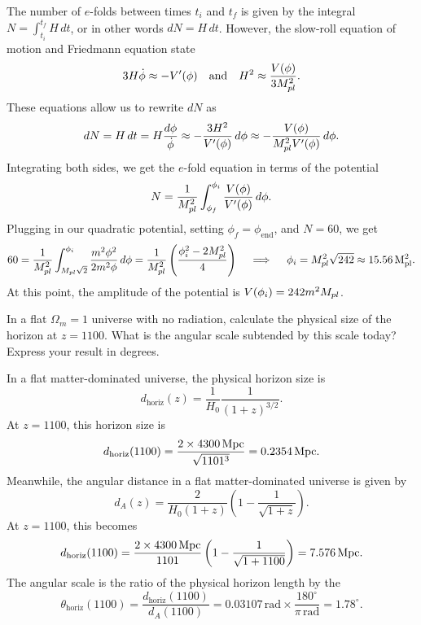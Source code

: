 \documentclass{lkx_pset}
\begin{document}
\begin{parts}
  The number of $e$-folds between times $t_i$ and $t_f$ is given by the integral $N=\int_{t_i}^{t_f} H\,dt$, or in other words $dN=H\,dt$. However, the slow-roll equation of motion and Friedmann equation state
  \[
    3H\dot{\phi}\approx -V'(\phi) \quad\textrm{and}\quad
    H^2 \approx \frac{V(\phi)}{3M_{pl}^2}.
  \]
  These equations allow us to rewrite $dN$ as 
  \[
    dN = H\,dt = H\frac{d\phi}{\dot\phi} \approx -\frac{3H^2}{V'(\phi)}\,d\phi \approx -\frac{V(\phi)}{M_{pl}^2 V'(\phi)}\,d\phi.
  \]
  Integrating both sides, we get the $e$-fold equation in terms of the potential
  \[
    N = \frac{1}{M_{pl}^2}\int_{\phi_f}^{\phi_i}\frac{V(\phi)}{V'(\phi)}\,d\phi.
  \]
  Plugging in our quadratic potential, setting $\phi_f = \phi_{\textrm{end}}$, and $N=60$, we get
  \[
    60 = \frac{1}{M_{pl}^2}\int_{M_{pl}\sqrt{2}}^{\phi_i} \frac{m^2\phi^2}{2m^2\phi}\,d\phi = \frac{1}{M_{pl}^2}\left(\frac{\phi_i^2-2M_{pl}^2}{4}\right)\quad\implies\quad \phi_i = M_{pl}^2\sqrt{242}\approx \qty[per-mode = symbol]{15.56}{M_{pl}^2}.
  \]
At this point, the amplitude of the potential is $V(\phi_i) = 242m^2M_{pl}$.
\end{parts}

\begin{problem}{2}
  In a flat $\Omega_m=1$ universe with no radiation, calculate the physical size of the horizon at $z=1100$. What is the angular scale subtended by this scale today? Express your result in degrees.
\end{problem}
\begin{solution}
  In a flat matter-dominated universe, the physical horizon size is
  \[
    d_{\textrm{horiz}}(z)=\frac{1}{H_0}\frac{1}{(1+z)^{3/2}}.
  \]
  At $z=1100$, this horizon size is
  \[
    d_{\textrm{horiz}}(1100)=\frac{2\times \Mpcsi{4300}}{\sqrt{1101^3}} = \Mpcsi{0.2354}.
  \]
  Meanwhile, the angular distance in a flat matter-dominated universe is given by
  \[
    d_{A}(z) = \frac{2}{H_0(1+z)}\left(1-\frac{1}{\sqrt{1+z}}\right).
  \]
  At $z=1100$, this becomes
  \[
    d_{\textrm{horiz}}(1100) = \frac{2\times \Mpcsi{4300}}{1101}\left(1- \frac{1}{\sqrt{1+1100}}\right) = \Mpcsi{7.576}.
  \]
  The angular scale is the ratio of the physical horizon length by the 
  \[
    \theta_{\textrm{horiz}}(1100) = \frac{d_{\textrm{horiz}}(1100)}{d_{A}(1100)} = {0.03107}\,\mathrm{rad}\times \frac{180^\circ}{\pi\,\mathrm{rad}} = 1.78^\circ.
  \]
\end{solution}
\end{document}
